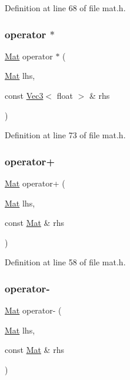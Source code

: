 Definition at line 68 of file mat.\+h.

\mbox{\label{class_mat_aa3444bb36ff3148a88cae1dd8867a72a}} 
\subsubsection{\texorpdfstring{operator $\ast$}{operator *}\hspace{0.1cm}{\footnotesize\ttfamily [2/2]}}
{\footnotesize\ttfamily \mbox{\hyperlink{class_mat}{Mat}} operator $\ast$ (\begin{DoxyParamCaption}\item[{\mbox{\hyperlink{class_mat}{Mat}}}]{lhs,  }\item[{const \mbox{\hyperlink{class_vec3}{Vec3}}$<$ float $>$ \&}]{rhs }\end{DoxyParamCaption})\hspace{0.3cm}{\ttfamily [friend]}}



Definition at line 73 of file mat.\+h.

\mbox{\label{class_mat_a6eec07eb288b59dcb2a27a63453ddad0}} 
\subsubsection{\texorpdfstring{operator+}{operator+}}
{\footnotesize\ttfamily \mbox{\hyperlink{class_mat}{Mat}} operator+ (\begin{DoxyParamCaption}\item[{\mbox{\hyperlink{class_mat}{Mat}}}]{lhs,  }\item[{const \mbox{\hyperlink{class_mat}{Mat}} \&}]{rhs }\end{DoxyParamCaption})\hspace{0.3cm}{\ttfamily [friend]}}



Definition at line 58 of file mat.\+h.

\mbox{\label{class_mat_a012d3be03352b7233247364175489564}} 
\subsubsection{\texorpdfstring{operator-\/}{operator-}}
{\footnotesize\ttfamily \mbox{\hyperlink{class_mat}{Mat}} operator-\/ (\begin{DoxyParamCaption}\item[{\mbox{\hyperlink{class_mat}{Mat}}}]{lhs,  }\item[{const \mbox{\hyperlink{class_mat}{Mat}} \&}]{rhs }\end{DoxyParamCaption})\hspace{0.3cm}{\ttfamily [friend]}}



